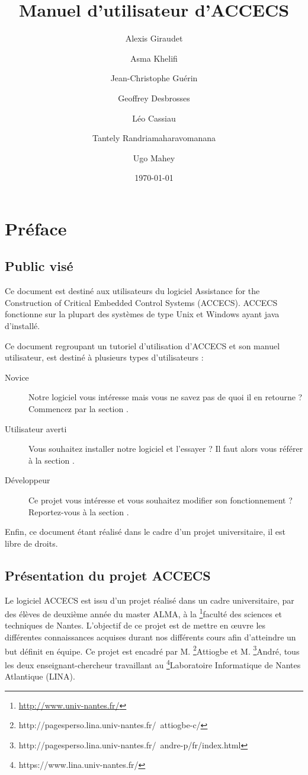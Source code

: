 \documentclass[a4paper]{article}
\title{Manuel d'utilisateur d'ACCECS}
\author{Alexis Giraudet \and Asma Khelifi \and Jean-Christophe Guérin \and Geoffrey Desbrosses \and Léo Cassiau \and Tantely Randriamaharavomanana \and Ugo Mahey}
\date\today
\begin{document}
\maketitle

\tableofcontents
\newpage

\section{Préface}
\subsection{Public visé}
    Ce document est destiné aux utilisateurs du logiciel Assistance for the Construction of Critical
Embedded Control Systems (ACCECS). ACCECS fonctionne sur la plupart des systèmes de type Unix et Windows ayant java d'installé. 
    
    Ce document regroupant un tutoriel d'utilisation d'ACCECS et son manuel utilisateur, est destiné à plusieurs types d'utilisateurs :
    \begin{description}
        \item[Novice] Notre logiciel vous intéresse mais vous ne savez pas de quoi il en retourne ? Commencez par la section .
        \item[Utilisateur averti] Vous souhaitez installer notre logiciel et l'essayer ? Il faut alors vous référer à la section .
        \item[Développeur] Ce projet vous intéresse et vous souhaitez modifier son fonctionnement ? Reportez-vous à la section .
    \end{description}

    Enfin, ce document étant réalisé dans le cadre d'un projet universitaire, il est libre de droits.
    
\subsection{Présentation du projet ACCECS}\label{sec:presentation}

    Le logiciel ACCECS est issu d'un projet réalisé dans un cadre universitaire, par des élèves de deuxième année du master ALMA, à la \footnote{\url{http://www.univ-nantes.fr/}}{faculté des sciences et techniques de Nantes}. L'objectif de ce projet est de mettre en \oe uvre les différentes connaissances acquises durant nos différents cours afin d'atteindre un but définit en équipe. Ce projet est encadré par M. \footnote{http://pagesperso.lina.univ-nantes.fr/~attiogbe-c/}{Attiogbe} et M. \footnote{http://pagesperso.lina.univ-nantes.fr/~andre-p/fr/index.html}{André}, tous les deux enseignant-chercheur travaillant au \footnote{https://www.lina.univ-nantes.fr/}{Laboratoire Informatique de Nantes Atlantique (LINA)}.
\end{document}
